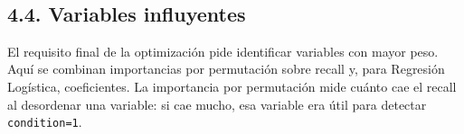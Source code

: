 \documentclass[11pt]{article}
\begin{document}
    \begin{center}
    \end{center}
    { \hspace*{\fill} \\}
    
    \subsection{4.4. Variables influyentes}\label{variables-influyentes}

El requisito final de la optimización pide identificar variables con
mayor peso. Aquí se combinan importancias por permutación sobre recall
y, para Regresión Logística, coeficientes. La importancia por
permutación mide cuánto cae el recall al desordenar una variable: si cae
mucho, esa variable era útil para detectar \texttt{condition=1}.
\end{document}
